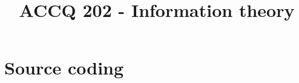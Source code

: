 \documentclass[a4paper,9pt]{article}
\title{\vspace{-1.2cm} ACCQ 202 - Information theory}
\date{}
\begin{document}
\maketitle

\vspace{-1.5cm}

\section{Source coding}

	
\end{document}
